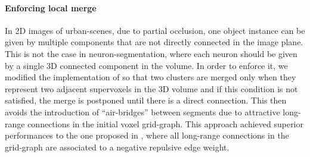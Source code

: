  \paragraph{Enforcing local merge} In 2D images of urban-scenes, due to partial occlusion, one object instance can be given by multiple components that are not directly connected in the image plane. This is not the case in neuron-segmentation, where each neuron should be given by a single 3D connected component in the volume. In order to enforce it, we modified the implementation of \algname{} so that two clusters are merged only when they represent two adjacent supervoxels in the 3D volume and if this condition is not satisfied, the merge is postponed until there is a direct connection. This then avoids the introduction of ``air-bridges'' between segments due to attractive long-range connections in the initial voxel grid-graph.
 This approach achieved superior performances to the one proposed in \cite{wolf2018mutex}, where all long-range connections in the grid-graph are associated to a negative repulsive edge weight.

